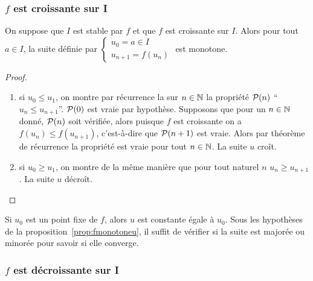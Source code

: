 \subsubsection{\(f\) est croissante sur I}

\begin{prop}\label{prop:fmonotoneu}
  On suppose que \(I\) est stable par \(f\) et que \(f\) est croissante sur \(I\). Alors pour tout \(a \in I\), la suite définie par \(\begin{cases} u_0=a \in I \\ u_{n+1}=f(u_n) \end{cases}\) est monotone.
\end{prop}
\begin{proof}
  \begin{enumerate}
  \item si \(u_0 \leqslant u_1\), on montre par récurrence la sur \(n \in \N\) la propriété \(\P(n)\) ``\(u_n \leqslant u_{n+1}\)''. \(\P(0)\) est vraie par hypothèse. Supposons que pour un \(n \in \N\) donné, \(\P(n)\) soit vérifiée, alors puisque \(f\) est croissante on a \(f(u_n) \leqslant f(u_{n+1})\), c'est-à-dire que \(\P(n+1)\) est vraie. Alors par théorème de récurrence la propriété est vraie pour tout \(n \in \N\). La suite \(u\) croît.
  \item si \(u_0 \geqslant u_1\), on montre de la même manière que pour tout naturel \(n\) \(u_n \geqslant u_{n+1}\). La suite \(u\) décroît.
  \end{enumerate}
\end{proof}

Si \(u_0\) est un point fixe de \(f\), alors \(u\) est constante égale à \(u_0\). Sous les hypothèses de la proposition~\ref{prop:fmonotoneu}, il suffit de vérifier si la suite est majorée ou minorée pour savoir si elle converge.

\subsubsection{\(f\) est décroissante sur I}

